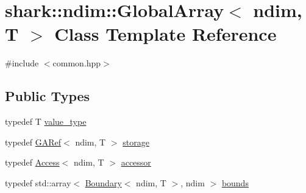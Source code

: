 \hypertarget{classshark_1_1ndim_1_1_global_array}{}\section{shark\+:\+:ndim\+:\+:Global\+Array$<$ ndim, T $>$ Class Template Reference}
\label{classshark_1_1ndim_1_1_global_array}


{\ttfamily \#include $<$common.\+hpp$>$}

\subsection*{Public Types}
\begin{DoxyCompactItemize}
\item 
typedef T \hyperlink{classshark_1_1ndim_1_1_global_array_ac2471050153d015a155f4c7106ae5b7c}{value\+\_\+type}
\item 
typedef \hyperlink{classshark_1_1ndim_1_1_g_a_ref}{G\+A\+Ref}$<$ ndim, T $>$ \hyperlink{classshark_1_1ndim_1_1_global_array_a776d645cf4cd4ca129af3b082d139936}{storage}
\item 
typedef \hyperlink{classshark_1_1ndim_1_1_access}{Access}$<$ ndim, T $>$ \hyperlink{classshark_1_1ndim_1_1_global_array_ac19db430fee866f14a2d8f64aabec734}{accessor}
\item 
typedef std\+::array$<$ \hyperlink{classshark_1_1ndim_1_1_boundary}{Boundary}$<$ ndim, T $>$, ndim $>$ \hyperlink{classshark_1_1ndim_1_1_global_array_a5376df376a8de6a0a756def884c55864}{bounds}
\end{DoxyCompactItemize}
